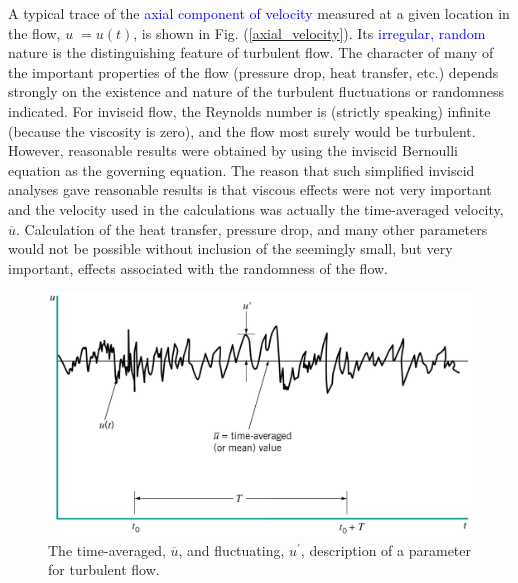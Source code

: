\documentclass[12pt,a4paper]{article}
\begin{document}
A typical trace of the \textcolor{blue}{axial component of velocity} measured at a given location in the flow, $u 􏰔= u(t)$, is shown in Fig. (\ref{axial_velocity}). Its \textcolor{blue}{irregular, random} nature is the distinguishing feature of turbulent flow. The character of many of the important properties of the flow (pressure drop, heat transfer, etc.) depends strongly on the existence and nature of the turbulent fluctuations or randomness indicated. For inviscid flow, the Reynolds number is (strictly speaking) infinite (because the viscosity is zero), and the flow most surely would be turbulent. However, reasonable results were obtained by using the inviscid Bernoulli equation as the governing equation. The reason that such simplified inviscid analyses gave reasonable results is that viscous effects were not very important and the velocity used in the calculations was actually the time-averaged velocity, $\overline{u}$. Calculation of the heat transfer, pressure drop, and many other parameters would not be possible without inclusion of the seemingly small, but very important, effects associated with the randomness of the flow.

\begin{figure}
\centering
\includegraphics[height=8.cm, angle=0]{axial_velocity.eps}
\caption{
The time-averaged, $\overline{u}$, and fluctuating, $u^\prime$, description of a parameter for turbulent flow.
}
\label{fig:axial_velocity}
\end{figure}
\end{document}
